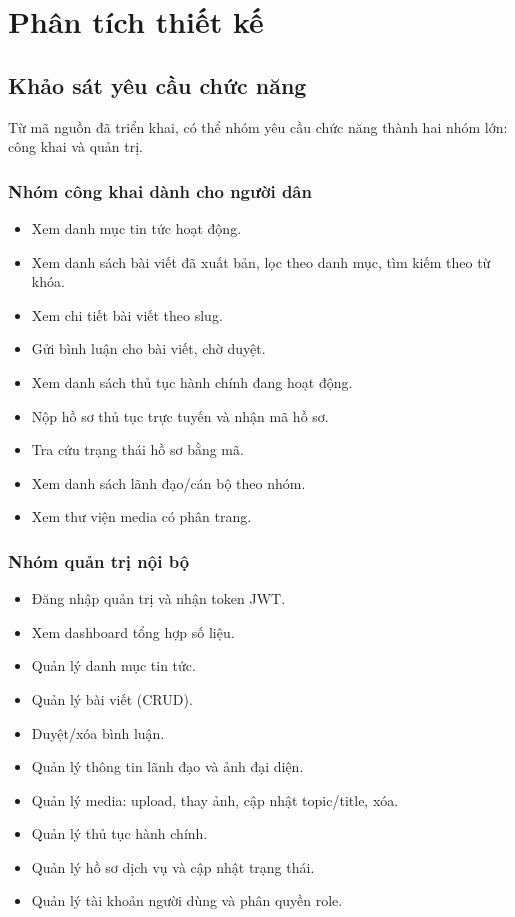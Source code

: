 \documentclass[12pt,a4paper]{article}
\begin{document}
\newpage

\section{Phân tích thiết kế}

\subsection{Khảo sát yêu cầu chức năng}
Từ mã nguồn đã triển khai, có thể nhóm yêu cầu chức năng thành hai nhóm lớn: công khai và quản trị.

\subsubsection{Nhóm công khai dành cho người dân}
\begin{itemize}[leftmargin=1.1cm]
  \item Xem danh mục tin tức hoạt động.
  \item Xem danh sách bài viết đã xuất bản, lọc theo danh mục, tìm kiếm theo từ khóa.
  \item Xem chi tiết bài viết theo slug.
  \item Gửi bình luận cho bài viết, chờ duyệt.
  \item Xem danh sách thủ tục hành chính đang hoạt động.
  \item Nộp hồ sơ thủ tục trực tuyến và nhận mã hồ sơ.
  \item Tra cứu trạng thái hồ sơ bằng mã.
  \item Xem danh sách lãnh đạo/cán bộ theo nhóm.
  \item Xem thư viện media có phân trang.
\end{itemize}

\subsubsection{Nhóm quản trị nội bộ}
\begin{itemize}[leftmargin=1.1cm]
  \item Đăng nhập quản trị và nhận token JWT.
  \item Xem dashboard tổng hợp số liệu.
  \item Quản lý danh mục tin tức.
  \item Quản lý bài viết (CRUD).
  \item Duyệt/xóa bình luận.
  \item Quản lý thông tin lãnh đạo và ảnh đại diện.
  \item Quản lý media: upload, thay ảnh, cập nhật topic/title, xóa.
  \item Quản lý thủ tục hành chính.
  \item Quản lý hồ sơ dịch vụ và cập nhật trạng thái.
  \item Quản lý tài khoản người dùng và phân quyền role.
\end{itemize}
\end{document}
